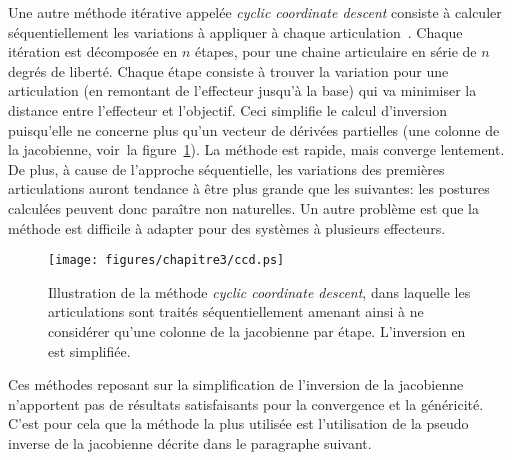 Une autre méthode itérative appelée \emph{cyclic coordinate descent}
consiste à calculer séquentiellement les variations à appliquer à chaque articulation~\cite{luenberger84, wang91}.
Chaque itération est décomposée en $n$ étapes, pour une chaine articulaire en série
de $n$ degrés de liberté. Chaque étape consiste à trouver la variation
pour une articulation (en remontant de l'effecteur jusqu'à la base) qui va minimiser la distance entre l'effecteur
et l'objectif.
Ceci simplifie le calcul d'inversion puisqu'elle ne concerne plus qu'un vecteur
de dérivées partielles (une colonne de la jacobienne, voir~la figure~\ref{fig:ccd}).
La méthode est rapide, mais converge lentement. De plus, à cause de l'approche séquentielle,
les variations des premières articulations auront tendance à être plus grande
que les suivantes: les postures calculées peuvent donc paraître non naturelles.
Un autre problème est que la méthode est difficile à adapter pour des systèmes
à plusieurs effecteurs.
\begin{figure}[t]
  \begin{center}
    \texttt{[image: figures/chapitre3/ccd.ps]}
  \end{center}
  \caption[\emph{Cyclic coordinate descent}.]{Illustration de la méthode \emph{cyclic coordinate descent}, dans laquelle les articulations
  sont traités séquentiellement amenant ainsi à ne considérer qu'une colonne de la jacobienne
  par étape. L'inversion en est simplifiée.}
  \label{fig:ccd}
\end{figure}

Ces méthodes reposant sur la simplification de l'inversion de la jacobienne n'apportent pas de 
résultats satisfaisants pour la convergence et la généricité. C'est pour cela que la 
méthode la plus utilisée est l'utilisation de la pseudo inverse de la jacobienne décrite
dans le paragraphe suivant.

